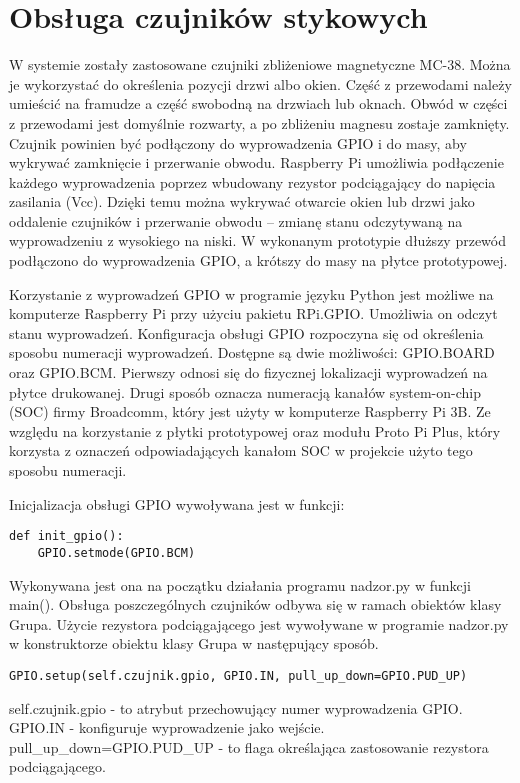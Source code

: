 \documentclass[a4paper,12pt,twoside]{report}
\begin{document}
\section{Obsługa czujników stykowych}
W systemie zostały zastosowane czujniki zbliżeniowe magnetyczne MC-38. Można je wykorzystać do określenia pozycji drzwi albo okien. Część z przewodami należy umieścić na framudze a część swobodną na drzwiach lub oknach. Obwód w części z przewodami jest domyślnie rozwarty, a po zbliżeniu magnesu zostaje zamknięty. Czujnik powinien być podłączony do wyprowadzenia GPIO i do masy, aby wykrywać zamknięcie i przerwanie obwodu. Raspberry Pi umożliwia podłączenie każdego wyprowadzenia poprzez wbudowany rezystor podciągający do napięcia zasilania (Vcc). Dzięki temu można wykrywać otwarcie okien lub drzwi jako oddalenie czujników i przerwanie obwodu -- zmianę stanu odczytywaną na wyprowadzeniu z wysokiego na niski. W wykonanym prototypie dłuższy przewód podłączono do wyprowadzenia GPIO, a krótszy do masy na płytce prototypowej.

Korzystanie z wyprowadzeń GPIO w programie języku Python jest możliwe na komputerze Raspberry Pi przy użyciu pakietu RPi.GPIO. Umożliwia on odczyt stanu wyprowadzeń. Konfiguracja obsługi GPIO rozpoczyna się od określenia sposobu numeracji wyprowadzeń. Dostępne są dwie możliwości: GPIO.BOARD oraz GPIO.BCM. Pierwszy odnosi się do fizycznej lokalizacji wyprowadzeń na płytce drukowanej. Drugi sposób oznacza numeracją kanałów system-on-chip (SOC) firmy Broadcomm, który jest użyty w komputerze Raspberry Pi 3B. Ze względu na korzystanie z płytki prototypowej oraz modułu Proto Pi Plus, który korzysta z oznaczeń odpowiadających kanałom SOC w projekcie użyto tego sposobu numeracji.

Inicjalizacja obsługi GPIO wywoływana jest w funkcji:  
\begin{lstlisting}
def init_gpio():
    GPIO.setmode(GPIO.BCM)
\end{lstlisting}
Wykonywana jest ona na początku działania programu nadzor.py w funkcji main(). Obsługa poszczególnych czujników odbywa się w ramach obiektów klasy Grupa. Użycie rezystora podciągającego jest wywoływane w programie nadzor.py w konstruktorze obiektu klasy Grupa w następujący sposób.
\begin{lstlisting}
GPIO.setup(self.czujnik.gpio, GPIO.IN, pull_up_down=GPIO.PUD_UP)
\end{lstlisting}
self.czujnik.gpio - to atrybut przechowujący numer wyprowadzenia GPIO.
GPIO.IN - konfiguruje wyprowadzenie jako wejście.
pull{\_}up{\_}down=GPIO.PUD{\_}UP - to flaga określająca zastosowanie rezystora podciągającego.
\end{document}
